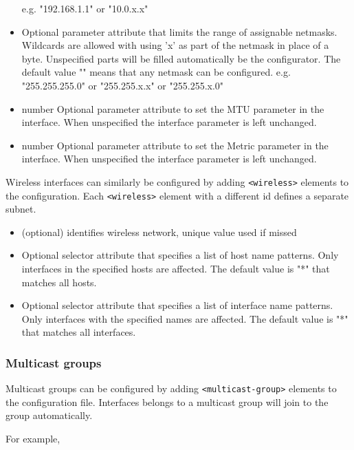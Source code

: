 \begin{itemize}
      e.g. "192.168.1.1" or "10.0.x.x"
    \item {}
      Optional parameter attribute that limits the range of assignable
      netmasks. Wildcards are allowed with using 'x' as part of the netmask
      in place of a byte. Unspecified parts will be filled automatically be
      the configurator. The default value "" means that any netmask can be
      configured.
      e.g. "255.255.255.0" or "255.255.x.x" or "255.255.x.0"
    \item {}                number
      Optional parameter attribute to set the MTU parameter in the interface.
      When unspecified the interface parameter is left unchanged.
    \item {}                number
      Optional parameter attribute to set the Metric parameter in the interface.
      When unspecified the interface parameter is left unchanged.
\end{itemize}

Wireless interfaces can similarly be configured by adding
\verb!<wireless>! elements to the configuration. Each \verb!<wireless>!
element with a different id defines a separate subnet.

\begin{itemize}
    \item {} (optional)
      identifies wireless network, unique value used if missed
    \item {}
      Optional selector attribute that specifies a list of host name patterns.
      Only interfaces in the specified hosts are affected. The default value
      is "*" that matches all hosts.
    \item {}
      Optional selector attribute that specifies a list of interface name
      patterns. Only interfaces with the specified names are affected. The
      default value is "*" that matches all interfaces.
\end{itemize}


\subsubsection{Multicast groups}
\label{sec:autoconfig:multicast-groups}

Multicast groups can be configured by adding \verb!<multicast-group>!
elements to the configuration file. Interfaces belongs to a multicast
group will join to the group automatically.

For example,

